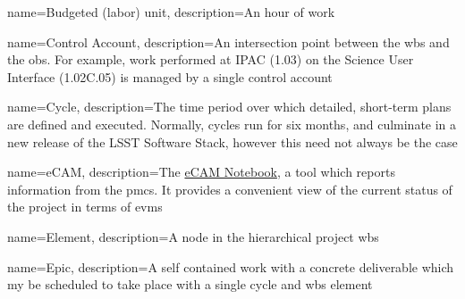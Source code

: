 


{
 name={Budgeted (labor) unit},
 description={An hour of work}
}



{
 name={Control Account},
 description={An intersection point between the \gls{wbs} and the \gls{obs}.
              For example, work performed at IPAC (1.03) on the Science User Interface (1.02C.05) is managed by a single control account}
}



{
 name=Cycle,
 description={The time period over which detailed, short-term plans are defined and executed.
              Normally, cycles run for six months, and culminate in a new release of the LSST Software Stack, however this need not always be the case}
}

{
 name=eCAM,
 description={The \href{https://msweb.lsstcorp.org/eCAM/}{eCAM Notebook}, a tool which reports information from the \gls{pmcs}.
              It provides a convenient view of the current status of the project in terms of \gls{evms}}
}

{
 name=Element,
 description={A node in the hierarchical project \gls{wbs}}
}

{
 name=Epic,
 description={A self contained work with a concrete deliverable which my be scheduled to take place with a single \gls{cycle} and \gls{wbs} \gls{element}}
}

